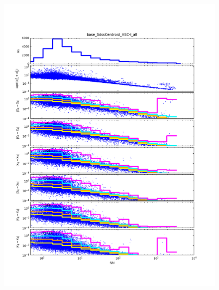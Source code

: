 \begin{figure}[t]
\centering
    \begin{minipage}{.49\textwidth}
        \centering
        \includegraphics[width=1.0\textwidth]{figure/rplot_all_base_SdssCentroid_HSC-I.png}
    \end{minipage}
    \begin{minipage}{.49\textwidth}
        \centering

\end{minipage}
\end{figure}
